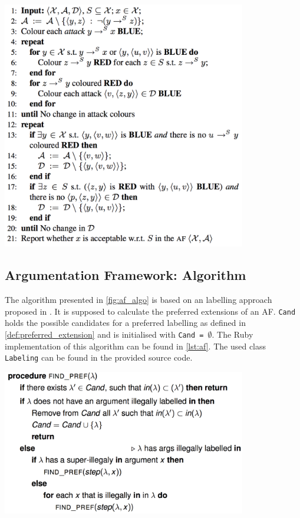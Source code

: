 \begin{algorithm}[!htp]
	\includegraphics[width=0.8\textwidth]{figures/eaf_algorithm}
	\caption{Deciding \gls{EAF} Acceptability of $x \in \X$ w.r.t. $S' \subseteq \X$ in $\langle \X, \A, \D \rangle$.}
	\label{fig:eaf_algo}
\end{algorithm}


\subsection{Argumentation Framework: Algorithm}
\label{sub:af_algorithm}

The algorithm presented in \cref{fig:af_algo} is based on an labelling approach proposed in \cite{Modgil2009Proof, rodrigues}. It is supposed to calculate the preferred extensions of an \gls{AF}. \texttt{Cand} holds the possible candidates for a preferred labelling as defined in \cref{def:preferred_extension} and is initialised with \texttt{Cand = $\emptyset$}. The Ruby implementation of this algorithm can be found in \cref{lst:af}. The used class \texttt{Labeling} can be found in the provided source code. 

\begin{algorithm}[!htp]
	\includegraphics[width=0.8\textwidth]{figures/af_labelling}
	\caption{Algorithm to compute preferred labelings $\lambda \in $ \texttt{Cand} for \glspl{AF} \cite{rodrigues}.}
	\label{fig:af_algo}
\end{algorithm}




